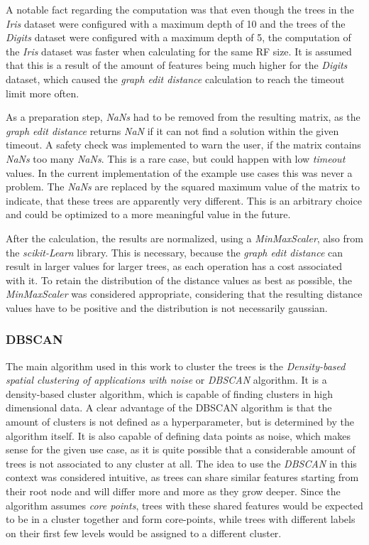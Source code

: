 \documentclass[a4paper, 12pt]{article}
\begin{document}
A notable fact regarding the computation was that even though the trees in the \textit{Iris} dataset
were configured with a maximum depth of 10 and the trees of the \textit{Digits} dataset were
configured with a maximum depth of 5, the computation of the \textit{Iris} dataset was
faster when calculating for the same RF size. It is assumed that this is a result of the amount
of features being much higher for the \textit{Digits} dataset, which caused the \textit{graph edit
    distance} calculation to reach the timeout limit more often. \par

As a preparation step, \textit{NaNs} had to be removed from the resulting matrix, as the
\textit{graph edit distance} returns \textit{NaN} if it can not find a solution within the given
timeout. A safety check was implemented to warn the user, if the matrix contains \textit{NaNs}
too many \textit{NaNs}. This is a rare case, but could happen with low \textit{timeout} values.
In the current implementation of the example use cases this was never a problem.
The \textit{NaNs} are replaced by the squared maximum value of the matrix to indicate, that these
trees are apparently very different. This is an arbitrary choice and could be optimized to a
more meaningful value in the future. \par

After the calculation, the results are normalized, using a \textit{MinMaxScaler}, also from the
\textit{scikit-Learn} library. This is necessary, because the \textit{graph edit distance} can
result in larger values for larger trees, as each operation has a cost associated with it. To
retain the distribution of the distance values as best as possible, the \textit{MinMaxScaler}
was considered appropriate, considering that the resulting distance values have to be positive
and the distribution is not necessarily gaussian.

\subsubsection{DBSCAN}
The main algorithm used in this work to cluster the trees is the \textit{Density-based spatial
    clustering of applications with noise} or \textit{DBSCAN} algorithm. It is
a density-based cluster algorithm, which is capable of finding clusters in high dimensional data.
A clear advantage of the DBSCAN algorithm is that the amount of clusters is not defined as a
hyperparameter, but is determined by the algorithm itself. It is also capable of defining data
points as noise, which makes sense for the given use case, as it is quite possible that a
considerable amount of trees is not associated to any cluster at all. The idea to use the
\textit{DBSCAN} in this context was considered intuitive, as trees can share similar features
starting from their root node and will differ more and more as they grow deeper. Since the
algorithm assumes \textit{core points}, trees with these shared features would be expected to
be in a cluster together and form core-points, while trees with different labels on their first
few levels would be assigned to a different cluster. \par
\end{document}
